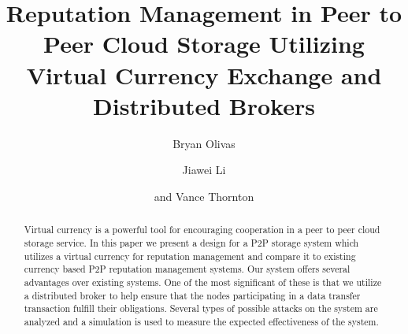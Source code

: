\documentclass[%
				10pt,
        final,
        notitlepage,
        narroweqnarray,
        inline,
        twoside,
        ]{ieee}
\begin{document}
\title[Reputation Management with Distributed Brokers]{%
       Reputation Management  in Peer to Peer Cloud Storage Utilizing Virtual Currency Exchange and Distributed Brokers}


\author{%
      Bryan Olivas
    \and
      Jiawei Li
    \and
      and Vance Thornton
}




\maketitle               

\begin{abstract}
Virtual currency is a powerful tool for encouraging cooperation in a peer to peer cloud storage service.  In this paper we present a design for a P2P storage system which utilizes a virtual currency for reputation management and compare it to existing currency based P2P reputation management systems.  Our system offers several advantages over existing systems.  One of the most significant of these is that we utilize a distributed broker to help ensure that the nodes participating in a data transfer transaction fulfill their obligations.  Several types of possible attacks on the system are analyzed and a simulation is used to measure the expected effectiveness of the system.
\end{abstract}
\end{document}
